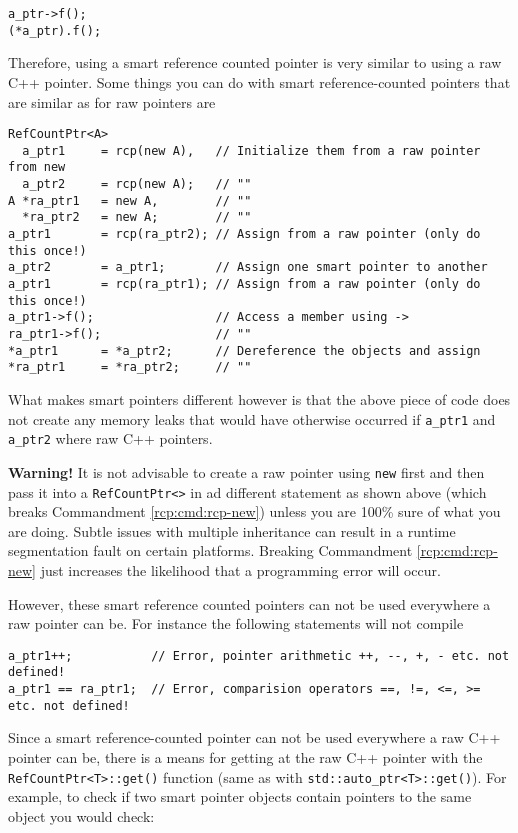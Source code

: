 {\scriptsize\begin{verbatim}
a_ptr->f();
(*a_ptr).f();
\end{verbatim}}

Therefore, using a smart reference counted pointer is very similar to
using a raw C++ pointer.  Some things you can do with smart
reference-counted pointers that are similar as for raw pointers are

{\scriptsize\begin{verbatim}
RefCountPtr<A>
  a_ptr1     = rcp(new A),   // Initialize them from a raw pointer from new
  a_ptr2     = rcp(new A);   // ""
A *ra_ptr1   = new A,        // ""
  *ra_ptr2   = new A;        // ""
a_ptr1       = rcp(ra_ptr2); // Assign from a raw pointer (only do this once!)
a_ptr2       = a_ptr1;       // Assign one smart pointer to another
a_ptr1       = rcp(ra_ptr1); // Assign from a raw pointer (only do this once!)
a_ptr1->f();                 // Access a member using ->
ra_ptr1->f();                // ""
*a_ptr1      = *a_ptr2;      // Dereference the objects and assign
*ra_ptr1     = *ra_ptr2;     // "" 
\end{verbatim}}

What makes smart pointers different however is that the above piece of code
does not create any memory leaks that would have otherwise occurred
if \texttt{a\_ptr1} and \texttt{a\_ptr2} where raw C++ pointers.

\textbf{Warning!} It is not advisable to create a raw pointer using
\texttt{new} first and then pass it into a \texttt{RefCountPtr<>} in
ad different statement as shown above (which breaks Commandment
\ref{rcp:cmd:rcp-new}) unless you are 100\% sure of what you are
doing.  Subtle issues with multiple inheritance can result in a
runtime segmentation fault on certain platforms.  Breaking Commandment
\ref{rcp:cmd:rcp-new} just increases the likelihood that a programming
error will occur.

However, these smart reference counted pointers can not be used
everywhere a raw pointer can be.  For instance the following
statements will not compile

{\scriptsize\begin{verbatim}
a_ptr1++;           // Error, pointer arithmetic ++, --, +, - etc. not defined!
a_ptr1 == ra_ptr1;  // Error, comparision operators ==, !=, <=, >= etc. not defined!
\end{verbatim}}

Since a smart reference-counted pointer can not be used everywhere a
raw C++ pointer can be, there is a means for getting at the raw C++
pointer with the \texttt{RefCountPtr<T>::get()} function (same as with
\texttt{std::auto\_ptr<T>::get()}).  For example, to check if two smart pointer
objects contain pointers to the same object you would check:

